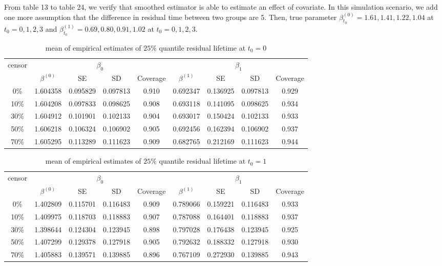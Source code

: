 \documentclass[12pt]{article}
\begin{document}
	From table 13 to table 24, we verify that smoothed estimator is able to estimate an effect of covariate. In this simulation scenario, we add one more assumption that the difference in residual time between two groups are 5. Then, true parameter $\beta_{t_0}^{(0)} = 1.61, 1.41, 1.22, 1.04$ at $t_0 = 0, 1, 2, 3$ and $\beta_{t_0}^{(1)} = 0.69, 0.80, 0.91, 1.02$ at $t_0 = 0, 1, 2, 3$.
	\begin{table}[hbt!]
		\caption{mean of empirical estimates of $25\%$ quantile residual lifetime at $t_0=0$}
		\centering
		\begin{tabular}{|c|c|c|c|c|c|c|c|c|}
			\hline
			\multirow{2}{*}{censor} & \multicolumn{4}{c|}{$\beta_0$} & \multicolumn{4}{c|}{$\beta_1$}\\ \cline{2-9}
			& $\beta^(0)$ & SE & SD  & Coverage  & $\beta^(1)$ & SE & SD & Coverage\\
			\hline\hline
			0\% & 1.604358 & 0.095829 & 0.097813 & 0.910 & 0.692347 & 0.136925 & 0.097813 & 0.929 \\
			10\% & 1.604208 & 0.097833 & 0.098625 & 0.908 & 0.693118 & 0.141095 & 0.098625 & 0.934 \\
			30\% & 1.604912 & 0.101901 & 0.102133 & 0.904 & 0.693017 & 0.150424 & 0.102133 & 0.933 \\
			50\% & 1.606218 & 0.106324 & 0.106902 & 0.905 & 0.692456 & 0.162394 & 0.106902 & 0.937 \\
			70\% & 1.605295 & 0.113289 & 0.111623 & 0.909 & 0.682765 & 0.212169 & 0.111623 & 0.944 \\ 
			\hline
		\end{tabular}
	\end{table}
	\begin{table}[hbt!]
		\caption{mean of empirical estimates of $25\%$ quantile residual lifetime at $t_0=1$}
		\centering
		\begin{tabular}{|c|c|c|c|c|c|c|c|c|}
			\hline
			\multirow{2}{*}{censor} & \multicolumn{4}{c|}{$\beta_0$} & \multicolumn{4}{c|}{$\beta_1$}\\ \cline{2-9}
			& $\beta^(0)$ & SE & SD  & Coverage  & $\beta^(1)$ & SE & SD & Coverage\\
			\hline\hline
			0\% & 1.402809 & 0.115701 & 0.116483 & 0.909 & 0.789066 & 0.159221 & 0.116483 & 0.933 \\
			10\% & 1.409975 & 0.118703 & 0.118883 & 0.907 & 0.787088 & 0.164401 & 0.118883 & 0.937 \\
			30\% & 1.398644 & 0.124304 & 0.123945 & 0.898 & 0.797028 & 0.176438 & 0.123945 & 0.925 \\
			50\% & 1.407299 & 0.129378 & 0.127918 & 0.905 & 0.792632 & 0.188332 & 0.127918 & 0.930 \\
			70\% & 1.405883 & 0.139571 & 0.139885 & 0.896 & 0.767109 & 0.272930 & 0.139885 & 0.943 \\ 
			\hline
		\end{tabular}
	\end{table}
\end{document}
